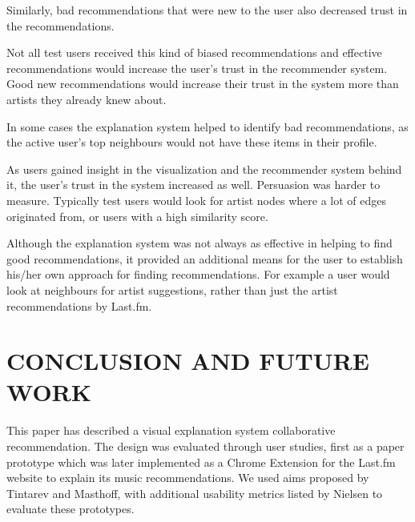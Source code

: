 \documentclass[a4paper,10pt,twocolumn]{article}
\begin{document}
Similarly, bad recommendations that were new to the user also decreased trust in the recommendations.

Not all test users received this kind of biased recommendations and effective recommendations would increase the user's trust in the recommender system. Good new recommendations would increase their trust in the system more than artists they already knew about.

In some cases the explanation system helped to identify bad recommendations, as the active user's top neighbours would not have these items in their profile.

As users gained insight in the visualization and the recommender system behind it, the user's trust in the system increased as well. Persuasion was harder to measure. Typically test users would look for artist nodes where a lot of edges originated from, or users with a high similarity score.

Although the explanation system was not always as effective in helping to find good recommendations, it provided an additional means for the user to establish his/her own approach for finding recommendations. For example a user would look at neighbours for artist suggestions, rather than just the artist recommendations by Last.fm.


\section{CONCLUSION AND FUTURE WORK}\label{section:conclusion}





This paper has described a visual explanation system collaborative recommendation. The design was evaluated through user studies, first as a paper prototype which was later implemented as a Chrome Extension for the Last.fm website to explain its music recommendations. We used aims proposed by Tintarev and Masthoff, with additional usability metrics listed by Nielsen to evaluate these prototypes.
\end{document}
